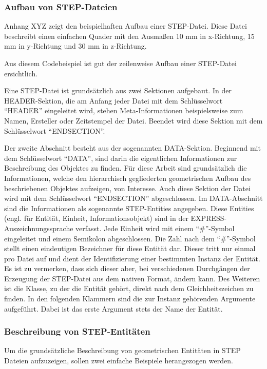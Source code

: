 \subsubsection{Aufbau von STEP-Dateien}

Anhang XYZ zeigt den beispielhaften Aufbau einer STEP-Datei. Diese Datei beschreibt einen einfachen Quader mit den Ausmaßen 10 mm in x-Richtung, 15 mm in y-Richtung und 30 mm in z-Richtung. 

Aus diesem Codebeispiel ist gut der zeilenweise Aufbau einer STEP-Datei ersichtlich. 

Eine STEP-Datei ist grundsätzlich aus zwei Sektionen aufgebaut. 
In der HEADER-Sektion, die am Anfang jeder Datei mit dem Schlüsselwort "`HEADER"' eingeleitet wird, stehen Meta-Informationen beispielsweise zum Namen, Ersteller oder Zeitstempel der Datei. Beendet wird diese Sektion mit dem Schlüsselwort "`ENDSECTION"'.

Der zweite Abschnitt besteht aus der sogenannten DATA-Sektion. Beginnend mit dem Schlüsselwort "`DATA"', sind darin die eigentlichen Informationen zur Beschreibung des Objektes zu finden. Für diese Arbeit sind grundsätzlich die Informationen, welche den hierarchisch gegliederten geometrischen Aufbau des beschriebenen Objektes aufzeigen, von Interesse. Auch diese Sektion der Datei wird mit dem Schlüsselwort "`ENDSECTION"' abgeschlossen. Im DATA-Abschnitt sind die Informationen als sogenannte STEP-Entities angegeben. Diese Entities (engl. für Entität, Einheit, Informationsobjekt) sind in der EXPRESS-Auszeichnungssprache verfasst. Jede Einheit wird mit einem "`\#"'-Symbol eingeleitet und einem Semikolon abgeschlossen. Die Zahl nach dem "`\#"'-Symbol stellt einen eindeutigen Bezeichner für diese Entität dar. Dieser tritt nur einmal pro Datei auf und dient der Identifizierung einer bestimmten Instanz der Entität. Es ist zu vermerken, dass sich dieser aber, bei verschiedenen Durchgängen der Erzeugung der STEP-Datei aus dem nativen Format, ändern kann.
Des Weiteren ist die Klasse, zu der die Entität gehört, direkt nach dem Gleichheitszeichen zu finden. In den folgenden Klammern sind die zur Instanz gehörenden Argumente aufgeführt. Dabei ist das erste Argument stets der Name der Entität. 

\subsubsection{Beschreibung von STEP-Entitäten}

Um die grundsätzliche Beschreibung von geometrischen Entitäten in STEP Dateien aufzuzeigen, sollen zwei einfache Beispiele herangezogen werden.

